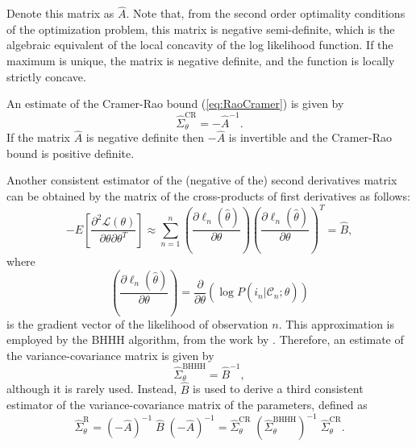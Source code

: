 \documentclass[12pt,a4paper]{article}
\newcommand{\req}[1]{(\ref{#1})}
\newcommand{\C}{\mathcal{C}}
\renewcommand{\L}{\mathcal{L}}
\begin{document}
Denote
this matrix as $\hat{A}$. Note that, from the second order optimality conditions of the optimization
problem, this matrix is negative semi-definite, which is the algebraic equivalent of the local  concavity of the
log likelihood function.
 If the maximum is unique, the matrix is negative definite, and the
 function is locally strictly concave. 




 An estimate of the Cramer-Rao
bound \req{eq:RaoCramer} is given by 
\begin{equation}
\label{eq:EstimateRaoCramer}
\widehat{\Sigma}^{\text{CR}}_{\theta} = -\hat{A}^{-1}.
\end{equation}
If  the matrix $\hat{A}$ is  negative definite then $-\hat{A}$ is invertible and the Cramer-Rao bound is positive definite. 

Another consistent estimator of the (negative of the) second
derivatives matrix can be obtained by the matrix of the cross-products of first derivatives as follows:
\begin{equation}
\label{eq:binaryBHHH}
-E\left[ \frac{\partial^2 \L(\theta)}{\partial \theta \partial \theta^T}\right] \approx  \sum_{n=1}^n \left(\frac{\partial \ell_n(\hat{\theta})}{\partial \theta} \right)\left(\frac{\partial \ell_n(\hat{\theta})}{\partial \theta} \right)^T = \hat{B},
\end{equation}
 where
\begin{equation}
\left(\frac{\partial \ell_n(\hat{\theta})}{\partial \theta} \right) = \frac{\partial}{\partial \theta} (\log P(i_n|\C_n;\widehat{\theta}))
\end{equation}
is the gradient vector of the likelihood of observation $n$.
This approximation is employed by the BHHH algorithm, from the work by . Therefore, an estimate of the variance-covariance matrix 
is given by 
\begin{equation}
\widehat{\Sigma}^{\text{BHHH}}_{\theta} =\hat{B}^{-1},
\end{equation}
 although it is rarely used. 
Instead, $\hat{B}$ is
used to derive  a third consistent estimator of the variance-covariance matrix of
the parameters, defined as
\begin{equation}
\label{eq:robustEstimator}
\widehat{\Sigma}^{\text{R}}_{\theta} = (-\hat{A})^{-1} \; \widehat{B}\; (-\hat{A})^{-1} = \widehat{\Sigma}^{\text{CR}}_{\theta} \; (\widehat{\Sigma}^{\text{BHHH}}_{\theta})^{-1} \; \widehat{\Sigma}^{\text{CR}}_{\theta}.
\end{equation}
\end{document}
